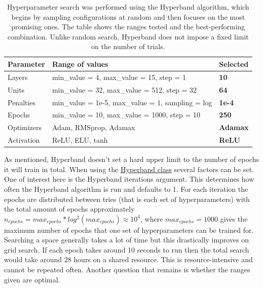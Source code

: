 \begin{table}[h]
    \centering
    \caption[Hyperparameter search with Hyperband]{Hyperparameter search was performed using the Hyperband algorithm, which begins by sampling configurations at random and then focuses on the most promising ones. The table shows the ranges tested and the best-performing combination. Unlike random search, Hyperband does not impose a fixed limit on the number of trials.}
    \label{table:gridSearchHyperparameters}
    \begin{tabular}{lll}
        \toprule
        Parameter & Range of values & Selected\\
        \midrule
        Layers &  min\_value = 4, max\_value = 15, step = 1 & \textbf{10}\\
        Units &  min\_value = 32, max\_value = 512, step = 32 & \textbf{64}\\
        Penalties & min\_value = 1e-5, max\_value = 1, sampling = log & \textbf{1e-4}\\
        Epochs & min\_value = 10, max\_value = 1000, step = 10 & \textbf{250}\\
        Optimizers & Adam, RMSprop, Adamax & \textbf{Adamax}\\
        Activation & ReLU, ELU, tanh & \textbf{ReLU}\\
        \bottomrule
    \end{tabular}
\end{table}

As mentioned, Hyperband doesn't set a hard upper limit to the number of epochs it will train in total. When using the \href{https://keras.io/api/keras_tuner/tuners/hyperband/}{Hyperband class} several factors can be set. One of interest here is the Hyperband iterations argument. This determines how often the Hyperband algorithm is run and defaults to 1. For each iteration the epochs are distributed between tries (that is each set of hyperparameters) with the total amount of epochs approximately $n_{epochs} = max_{epochs} * log^2(max_{epochs})\approx 10^4$, where $max_{epochs} = 1000$ gives the maximum number of epochs that one set of hyperparameters can be trained for. Searching a space generally takes a lot of time but this drastically improves on grid search. If each epoch takes around 10 seconds to run then the total search would take around 28 hours on a shared resource. This is resource-intensive and cannot be repeated often. Another question that remains is whether the ranges given are optimal.

